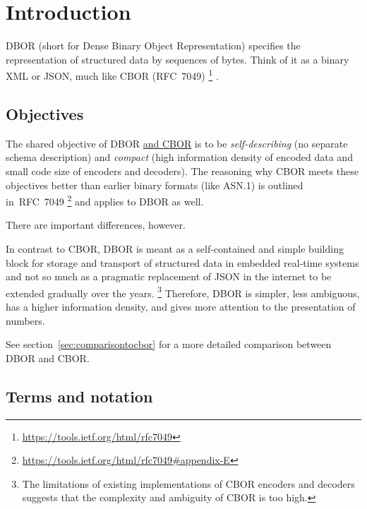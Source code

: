 
\section{Introduction}

DBOR (short for Dense Binary Object Representation) specifies the representation of structured data by
sequences of bytes. Think of it as a binary XML or JSON, much like CBOR (RFC~7049)%
\footnote{%
    \url{https://tools.ietf.org/html/rfc7049}
}%
.


\subsection{Objectives}

The shared objective of DBOR \href{https://tools.ietf.org/html/rfc7049\#section-1.1}{and CBOR} is to be
\emph{self-describing} (no separate schema description) and
\emph{compact} (high information density of encoded data and small code size of encoders and decoders).
The reasoning why CBOR meets these objectives better than earlier binary formats (like ASN.1) is outlined in~RFC~7049%
\footnote{%
    \url{https://tools.ietf.org/html/rfc7049\#appendix-E}
}
and applies to DBOR as well.

\medskip
There are important differences, however.

In contrast to CBOR, DBOR is meant as a self-contained and simple building block for storage and transport
of structured data in embedded real-time systems and not so much as a pragmatic replacement of JSON in the internet
to be extended gradually over the years.%
\footnote{%
    The limitations of existing implementations of CBOR encoders and decoders suggests
    that the complexity and ambiguity of CBOR is too high.
}
Therefore, DBOR is simpler, less ambiguous, has a higher information density, and gives more attention
to the presentation of numbers.

\medskip
See section~\ref{sec:comparisontocbor} for a more detailed comparison between DBOR and CBOR.


\subsection{Terms and notation}

